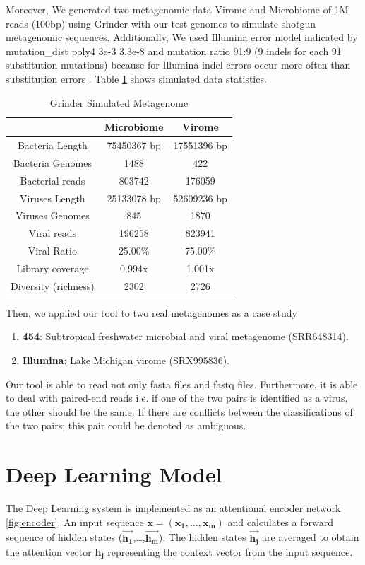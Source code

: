 \documentclass[conference]{IEEEtran}
\begin{document}
Moreover, We generated two metagenomic data Virome and Microbiome of 1M reads (100bp) using Grinder \cite{angly2012grinder} with our test genomes to simulate shotgun metagenomic sequences. Additionally, We used Illumina error model indicated by mutation\_dist poly4 3e-3 3.3e-8 and mutation ratio 91:9 (9 indels for each 91 substitution mutations) because for Illumina indel errors occur more often than substitution errors \cite{laehnemann2015denoising}. Table \ref{table:simulate_stats} shows simulated data statistics.  \\

\begin{table}[h!]
	\centering
	\begin{tabular}{||c c c||} 
		& Microbiome & Virome \\ [0.5ex] 
		\hline\hline
		Bacteria Length & 75450367  bp  & 17551396 bp  \\
		Bacteria Genomes & 1488 & 422\\
		Bacterial reads & 803742 & 176059\\
		Viruses Length & 25133078 bp  & 52609236 bp  \\ 
		Viruses Genomes & 845 & 1870\\
		Viral reads & 196258 & 823941 \\  
		Viral Ratio & 25.00\% & 75.00\% \\ 
		Library coverage &  0.994x &  1.001x  \\
		Diversity (richness) & 2302 & 2726 \\ [1ex]
	\end{tabular}
	\caption{Grinder Simulated Metagenome}
	\label{table:simulate_stats}
\end{table}

Then, we applied our tool to two real metagenomes as a case study
\begin{enumerate}
	\item \textbf{454}: Subtropical freshwater microbial and viral metagenome (SRR648314).\
	\item \textbf{Illumina}: Lake Michigan virome (SRX995836).
\end{enumerate}

Our tool is able to read not only fasta files and fastq files. Furthermore, it is able to deal with paired-end reads i.e. if one of the two pairs is identified as a virus, the other should be the same. If there are conflicts between the classifications of the two pairs; this pair could be denoted as ambiguous.

\section{Deep Learning Model}
The Deep Learning system is implemented as an attentional encoder network  \ref{fig:encoder}. An input sequence  $\mathbf{x = (x_{1} , \ldots{} , x_{m} )}$  and calculates a forward sequence of hidden states  ($\mathbf{\overrightarrow{h_{1}}}$,\ldots{},$\mathbf{ \overrightarrow{h_{m}}}$). The hidden states $\mathbf{\overrightarrow{h_{j}}}$  are averaged to obtain the attention vector $\mathbf{h_{j}}$ representing the context vector from the input sequence.
\end{document}
